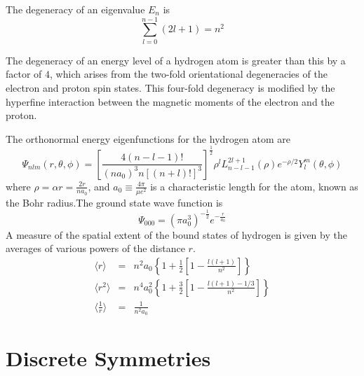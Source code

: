 The degeneracy of an eigenvalue $E_n$ is
\[\sum_{l=0}^{n-1} (2l+1) = n^2\]
\begin{note}
The degeneracy of an energy level of a hydrogen atom is greater than this by a factor of $4$, which arises from the two-fold orientational degeneracies of the electron and proton spin states. This four-fold degeneracy is modified by the hyperfine interaction between the magnetic moments of the electron and the proton.
\end{note}
The orthonormal energy eigenfunctions for the hydrogen atom are
\[\Psi_{nlm}(r,\theta,\phi) =  \left[ \frac{4(n-l-1)!}{(na_0)^3 n[(n+l)!]^3} \right]^{\frac{1}{2}} \rho^l L_{n-l-1}^{2l+1}(\rho) e^{-\rho/2} Y_l^m (\theta,\phi)\]
where $\rho = \alpha r = \frac{2r}{na_0}$, and $a_0 \equiv \frac{4\pi}{\mu e^2}$ is a characteristic length for the
atom, known as the Bohr radius.The ground state wave
function is
\[\Psi_{000} = (\pi a_0^3)^{-\frac{1}{2}} e^{-\frac{r}{a_0}}\]
A measure of the spatial extent of the bound states of hydrogen is given by the averages of various powers of the distance $r$.
\begin{eqnarray}
\langle r \rangle &=& n^2a_0 \left \{ 1 + \frac{1}{2} \left [ 1 - \frac{l(l+1)}{n^2} \right] \right\} \nonumber \\
\langle r^2 \rangle &=& n^4a_0^2 \left \{ 1 + \frac{3}{2} \left [ 1 - \frac{l(l+1)-1/3}{n^2} \right] \right\} \nonumber \\
\langle \frac{1}{r} \rangle &=& \frac{1}{n^2 a_0} \nonumber
\end{eqnarray}

\chapter{Discrete Symmetries}
